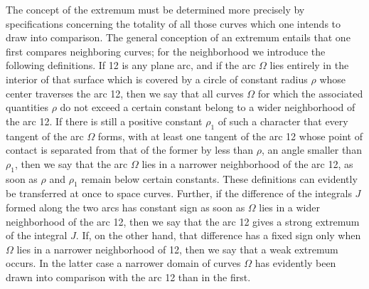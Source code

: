 \documentclass[11pt,a4paper,leqno]{article}
\begin{document}
The concept of the extremum must be determined more precisely by specifications concerning the totality of all those curves which one intends to draw into comparison. The general conception of an extremum entails that one first compares neighboring curves; for the neighborhood we introduce the following definitions. If 12 is any plane arc, and if the arc $\Omega$ lies entirely in the interior of that surface which is covered by a circle of constant radius $\rho$ whose center traverses the arc 12, then we say that all curves $\Omega$ for which the associated quantities $\rho$ do not exceed a certain constant belong to a wider neighborhood of the arc 12. If there is still a positive constant $\rho_1$ of such a character that every tangent of the arc $\Omega$ forms, with at least one tangent of the arc 12 whose point of contact is separated from that of the former by less than $\rho$, an angle smaller than $\rho_1$, then we say that the arc $\Omega$ lies in a narrower neighborhood of the arc 12, as soon as $\rho$ and $\rho_1$ remain below certain constants. These definitions can evidently be transferred at once to space curves. Further, if the difference of the integrals $J$ formed along the two arcs has constant sign as soon as $\Omega$ lies in a wider neighborhood of the arc 12, then we say that the arc 12 gives a strong extremum of the integral $J$. If, on the other hand, that difference has a fixed sign only when $\Omega$ lies in a narrower neighborhood of 12, then we say that a weak extremum occurs. In the latter case a narrower domain of curves $\Omega$ has evidently been drawn into comparison with the arc 12 than in the first.
\end{document}
